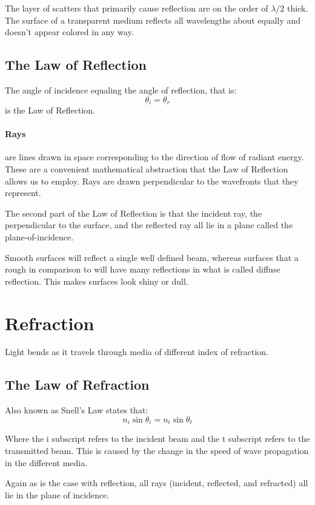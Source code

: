 \documentclass[12pt]{report}
\begin{document}
The layer of scatters that primarily cause reflection are on the order of $\lambda/2$ thick. The surface of a transparent medium reflects all wavelengths about equally and doesn't appear colored in any way. 

\subsection{The Law of Reflection}
The angle of incidence equaling the angle of reflection, that is:
\begin{equation}
\theta_i = \theta_r
\end{equation}
is the Law of Reflection. 

\paragraph{Rays} are lines drawn in space corresponding to the direction of flow of radiant energy. These are a convenient mathematical abstraction that the Law of Reflection allows us to employ. Rays are drawn perpendicular to the wavefronts that they represent. 

The second part of the Law of Reflection is that the incident ray, the perpendicular to the surface, and the reflected ray all lie in a plane called the plane-of-incidence. 

Smooth surfaces will reflect a single well defined beam, whereas surfaces that a rough in comparison to \textlambda will have many reflections in what is called diffuse reflection. This makes surfaces look shiny or dull.

\section{Refraction}
Light bends as it travels through media of different index of refraction. 
\subsection{The Law of Refraction}
Also known as Snell's Law states that:
\begin{equation}
n_i\sin\theta_i = n_t\sin\theta_t
\end{equation}

Where the i subscript refers to the incident beam and the t subscript refers to the transmitted beam. This is caused by the change in the speed of wave propagation in the different media. 

Again as is the case with reflection, all rays (incident, reflected, and refracted) all lie in the plane of incidence. 
\end{document}
